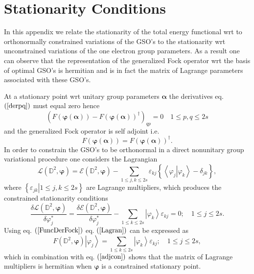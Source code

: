 \documentclass[titlepage]{article}%
\begin{document}
\section{Stationarity Conditions\label{StatCon}}

In this appendix we relate the stationarity of the total energy functional wrt
to orthonormally constrained variations of the GSO's to the stationarity wrt
unconstrained variations of the one electron group parameters. As a result one
can observe that the representation of the generalized Fock operator wrt the
basis of optimal GSO's is hermitian and is in fact the matrix of Lagrange
parameters associated with these GSO's.

At a stationary point wrt unitary group parameters $\bm{\alpha}$ the
derivatives eq. $\left(  \ref{derpq}\right)  $ must equal zero hence
\begin{equation}
\left(  F\left(  \bm{\varphi}\left(  \bm{\alpha}\right)  \right)  -F\left(
\bm{\varphi}\left(  \bm{\alpha}\right)  \right)  ^{\dagger}\right)
_{qp}=0\quad1\leq p,q\leq2s
\end{equation}
and the generalized Fock operator is self adjoint i.e.
\begin{equation}
F\left(  \bm{\varphi}\left(  \bm{\alpha}\right)  \right)  =F\left(
\bm{\varphi}\left(  \bm{\alpha}\right)  \right)  ^{\dagger}. \label{adjcon}%
\end{equation}
In order to constrain the GSO's to be orthonormal in a direct nonunitary group
variational procedure one considers the Lagrangian
\begin{equation}
\mathcal{L}\left(  \mathbb{D}^{2},\bm{\varphi}\right)  =\mathcal{E}\left(
\mathbb{D}^{2},\bm{\varphi}\right)  -\sum_{1\leq j,k\leq2s}\varepsilon
_{kj}\left\{  \left\langle \left.  \varphi_{j}\right\vert \varphi
_{k}\right\rangle -\delta_{jk}\right\}  ,
\end{equation}
where $\left\{  \left.  \varepsilon_{jk}\right\vert 1\leq j,k\leq2s\right\}  $
are Lagrange multipliers, which produces the constrained stationarity
conditions
\begin{equation}
\frac{\delta\mathcal{L}\left(  \mathbb{D}^{2},\bm{\varphi}\right)  }%
{\delta\varphi_{j}^{\ast}}=\frac{\delta\mathcal{E}\left(  \mathbb{D}%
^{2},\bm{\varphi}\right)  }{\delta\varphi_{j}^{\ast}}-\sum_{1\leq k\leq
2s}\left\vert \varphi_{k}\right\rangle \varepsilon_{kj}=0;\quad1\leq j\leq2s.
\label{Lagran}%
\end{equation}
Using eq. $\left(  \ref{FuncDerFock}\right)  $ eq. $\left(  \ref{Lagran}%
\right)  $ can be expressed as
\begin{equation}
F\left(  \mathbb{D}^{2},\bm{\varphi}\right)  \left\vert \varphi_{j}%
\right\rangle =\sum_{1\leq k\leq2s}\left\vert \varphi_{k}\right\rangle
\varepsilon_{kj};\quad1\leq j\leq2s,
\end{equation}
which in combination with eq. $\left(  \ref{adjcon}\right)  $ shows that the
matrix of Lagrange multipliers is hermitian when $\bm{\varphi}$ is a
constrained stationary point.
\end{document}

